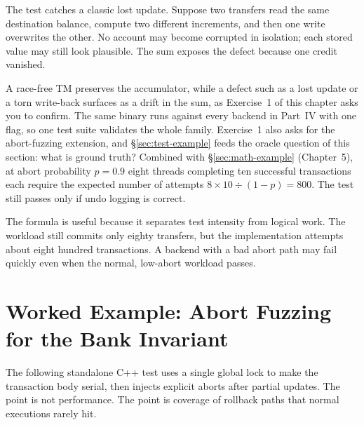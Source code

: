The test catches a classic lost update. Suppose two transfers read the same destination balance, compute two different increments, and then one write overwrites the other. No account may become corrupted in isolation; each stored value may still look plausible. The sum exposes the defect because one credit vanished.

A race-free TM preserves the accumulator, while a defect such as a lost update or a torn write-back surfaces as a drift in the sum, as Exercise~1 of this chapter asks you to confirm. The same binary runs against every backend in Part~IV with one flag, so one test suite validates the whole family. Exercise~1 also asks for the abort-fuzzing extension, and \S\ref{sec:test-example} feeds the oracle question of this section: what is ground truth? Combined with \S\ref{sec:math-example} (Chapter~5), at abort probability $p = 0.9$ eight threads completing ten successful transactions each require the expected number of attempts $8 \times 10 \div (1-p) = 800$. The test still passes only if undo logging is correct.

The formula is useful because it separates test intensity from logical work. The workload still commits only eighty transfers, but the implementation attempts about eight hundred transactions. A backend with a bad abort path may fail quickly even when the normal, low-abort workload passes.

\section{Worked Example: Abort Fuzzing for the Bank Invariant}
\label{sec:abort-fuzz-bank}

The following standalone C++ test uses a single global lock to make the transaction body serial, then injects explicit aborts after partial updates. The point is not performance. The point is coverage of rollback paths that normal executions rarely hit.

